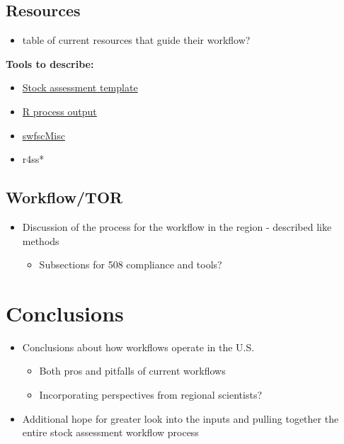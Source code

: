 \documentclass[
  letterpaper,
  oneside,
  open=any]{scrbook}
\providecommand{\tightlist}{%
  \setlength{\itemsep}{0pt}\setlength{\parskip}{0pt}}\usepackage{longtable,booktabs,array}
\begin{document}
\section{Resources}\label{resources-5}

\begin{itemize}
\tightlist
\item
  table of current resources that guide their workflow?
\end{itemize}

\textbf{Tools to describe:}

\begin{itemize}
\item
  \href{https://github.com/melissamonk-NOAA/StockAssessment_template}{Stock
  assessment template}
\item
  \href{https://github.com/peterkuriyama/cpsassessment/blob/main/R/process_output.R}{R
  process output}
\item
  \href{https://github.com/EricArcher/swfscMisc/tree/master}{swfscMisc}
\item
  r4ss*
\end{itemize}

\section{Workflow/TOR}\label{workflowtor-2}

\begin{itemize}
\item
  Discussion of the process for the workflow in the region - described
  like methods

  \begin{itemize}
  \tightlist
  \item
    Subsections for 508 compliance and tools?
  \end{itemize}
\end{itemize}


\chapter{Conclusions}\label{conclusions}

\begin{itemize}
\item
  Conclusions about how workflows operate in the U.S.

  \begin{itemize}
  \item
    Both pros and pitfalls of current workflows
  \item
    Incorporating perspectives from regional scientists?
  \end{itemize}
\item
  Additional hope for greater look into the inputs and pulling together
  the entire stock assessment workflow process
\end{itemize}
\end{document}
